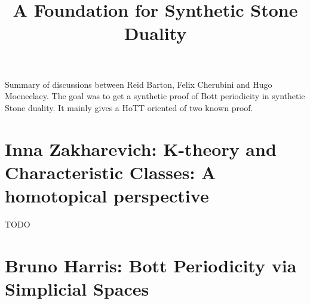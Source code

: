 \documentclass{../util/zariski}
\title{A Foundation for Synthetic Stone Duality}
\begin{document}
\author{}
\date{}

\maketitle

Summary of discussions between Reid Barton, Felix Cherubini and Hugo Moeneclaey. The goal was to get a synthetic proof of Bott periodicity in synthetic Stone duality. It mainly gives a HoTT oriented of two known proof.

\section{Inna Zakharevich: K-theory and Characteristic Classes: A homotopical perspective}
TODO

\section{Bruno Harris: Bott Periodicity via Simplicial Spaces}


\printbibliography
\end{document}
